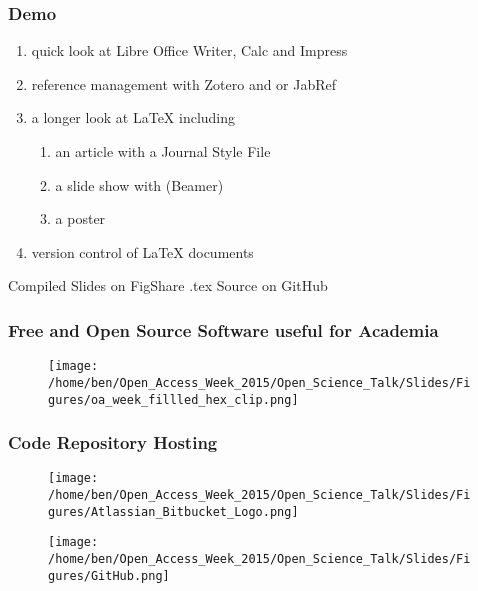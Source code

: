 \documentclass[xcolor=dvipsnames]{beamer}
\begin{document}
\begin{frame}
\frametitle{Demo}
\begin{enumerate}
\item quick look at Libre Office Writer, Calc and Impress 
\newline
\item reference management with Zotero and or JabRef
\newline
\item a longer look at LaTeX including \begin{enumerate}  
      \item an article with a Journal Style File
      \item a slide show with (Beamer)
      \item a poster 
\newline
\end{enumerate}
\item version control of LaTeX documents
\end{enumerate}

\end{frame}


\begin{frame}
Compiled Slides on FigShare
.tex Source on GitHub

\end{frame}


\begin{frame}
\frametitle{Free and Open Source Software useful for Academia}
\begin{center}
\begin{figure}
\texttt{[image: /home/ben/Open\_Access\_Week\_2015/Open\_Science\_Talk/Slides/Figures/oa\_week\_fillled\_hex\_clip.png]}
\end{figure}
\end{center}
\end{frame}

\begin{frame}
\frametitle{Code Repository Hosting}
\begin{center}

\begin{figure}
\texttt{[image: /home/ben/Open\_Access\_Week\_2015/Open\_Science\_Talk/Slides/Figures/Atlassian\_Bitbucket\_Logo.png]}
\end{figure}

\begin{figure}
\texttt{[image: /home/ben/Open\_Access\_Week\_2015/Open\_Science\_Talk/Slides/Figures/GitHub.png]}
\end{figure}
\end{center}

\end{frame}
\end{document}
